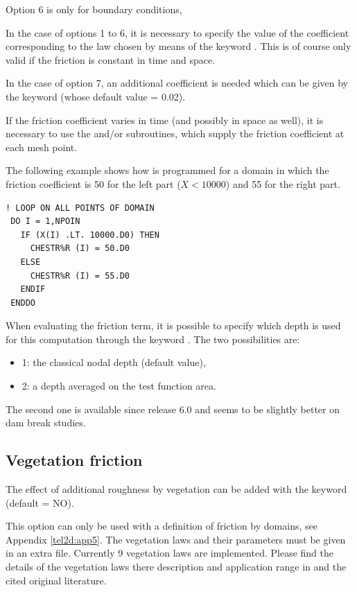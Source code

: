 Option 6 is only for boundary conditions,

In the case of options 1 to 6, it is necessary to specify the value
of the coefficient corresponding to the law chosen by means of the keyword
.
This is of course only valid if the friction is constant in time and space.

In the case of option 7, an additional coefficient is needed which can be given
by the keyword
(whose default value = 0.02).

If the friction coefficient varies in time (and possibly in space as well),
it is necessary to use the  and/or 
subroutines, which supply the friction coefficient at each mesh point.

The following example shows how  is programmed for a
domain in which the friction coefficient is 50 for the left part ($X<10000$)
and 55 for the right part.
\begin{lstlisting}[language=TelFortran]
! LOOP ON ALL POINTS OF DOMAIN
 DO I = 1,NPOIN
   IF (X(I) .LT. 10000.D0) THEN
     CHESTR%R (I) = 50.D0
   ELSE
     CHESTR%R (I) = 55.D0
   ENDIF
 ENDDO
\end{lstlisting}
When evaluating the friction term, it is possible to specify which depth is used
for this computation through the keyword .
The two possibilities are:
\begin{itemize}
\item 1: the classical nodal depth (default value),
\item 2: a depth averaged on the test function area.
\end{itemize}
The second one is available since release 6.0 and seems to be slightly better
on dam break studies.


\subsection{Vegetation friction}

The effect of additional roughness by vegetation can be added
with the keyword  (default = NO).

This option can only be used with a definition of friction by domains,
see Appendix \ref{tel2d:app5}. The vegetation laws and their parameters
must be given in an extra file. Currently 9 vegetation laws are implemented.
Please find the details of the vegetation laws there description and application range in
\cite{folke2019vegetation} and the cited original literature.

